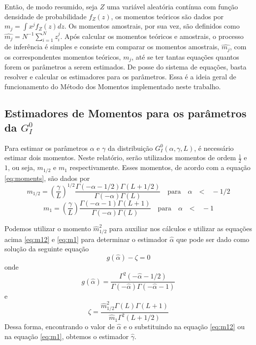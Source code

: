Então, de modo resumido, seja $Z$ uma variável aleatória contínua com função densidade de probabilidade $f_Z(z)$, os momentos teóricos são dados por $m_j = \int x^jf_Z(z)dz$. Os momentos amostrais, por sua vez, são definidos como $\widehat{m_j} = N^{-1}\sum_{i=1}^{N}z_i^j$. Após calcular os momentos teóricos e amostrais, o processo de inferência é simples e consiste em comparar os momentos amostrais, $\widehat{m_j}$, com os correspondentes momentos teóricos, $m_j$, até se ter tantas equações quantos forem os parâmetros a serem estimados. De posse do sistema de equações, basta resolver e calcular os estimadores para os parâmetros. Essa é a ideia geral de funcionamento do Método dos Momentos implementado neste trabalho.

\subsection{Estimadores de Momentos para os parâmetros da $G_I^0$}

Para estimar os parâmetros $\alpha$ e $\gamma$ da distribuição $G_I^0(\alpha, \gamma, L)$, é necessário estimar dois momentos. Neste relatório, serão utilizados momentos de ordem $\frac{1}{2}$ e $1$, ou seja, $m_{1/2}$ e $m_1$ respectivamente. Esses momentos, de acordo com a equação \eqref{eq:moments}, são dados por
\begin{equation}
    m_{1/2} = \left ( \frac{\gamma}{L}\right )^{1/2} \frac{\Gamma(-\alpha-1/2)\Gamma(L+1/2)}{\Gamma(-\alpha)\Gamma(L)} \quad \text{para} \quad \alpha \quad \text{<} \quad -1/2 \label{eq:m12}
\end{equation}
\begin{equation}
    m_{1} = \left ( \frac{\gamma}{L}\right ) \frac{\Gamma(-\alpha-1)\Gamma(L+1)}{\Gamma(-\alpha)\Gamma(L)} \quad \text{para} \quad \alpha \quad \text{<} \quad -1 \label{eq:m1}
\end{equation}

Podemos utilizar o momento $\widehat{m}_{1/2}^2$ para auxiliar nos cálculos e utilizar as equações acima \eqref{eq:m12} e \eqref{eq:m1} para determinar o estimador $\widehat{\alpha}$ que pode ser dado como solução da seguinte equação
\begin{equation}
    g(\widehat{\alpha}) - \zeta = 0
\end{equation}
onde 
\begin{equation}
    g(\widehat{\alpha}) = \frac{\Gamma^2(-\widehat{\alpha} - 1/2)}{\Gamma(-\widehat{\alpha})\Gamma(-\widehat{\alpha} - 1)}
\end{equation}
e
\begin{equation}
    \zeta = \frac{\widehat{m}_{1/2}^2\Gamma(L)\Gamma(L+1)}{\widehat{m}_{1}\Gamma^2(L+1/2)}
\end{equation}
Dessa forma, encontrando o valor de $\widehat{\alpha}$ e o substituindo na equação \eqref{eq:m12} ou na equação \eqref{eq:m1}, obtemos o estimador $\widehat{\gamma}$.

